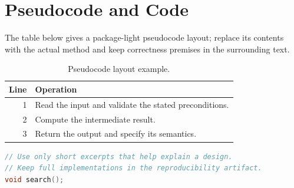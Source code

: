 \section{Pseudocode and Code}
The table below gives a package-light pseudocode layout; replace its contents
with the actual method and keep correctness premises in the surrounding text.
\begin{table}[tbp]
\centering
\caption{Pseudocode layout example.}
\begin{tabularx}{\linewidth}{@{}rX@{}}
\toprule
Line & Operation \\
\midrule
1 & Read the input and validate the stated preconditions. \\
2 & Compute the intermediate result. \\
3 & Return the output and specify its semantics. \\
\bottomrule
\end{tabularx}
\end{table}
\begin{lstlisting}[language=C++,caption={Code-listing format example.}]
// Use only short excerpts that help explain a design.
// Keep full implementations in the reproducibility artifact.
void search();
\end{lstlisting}
